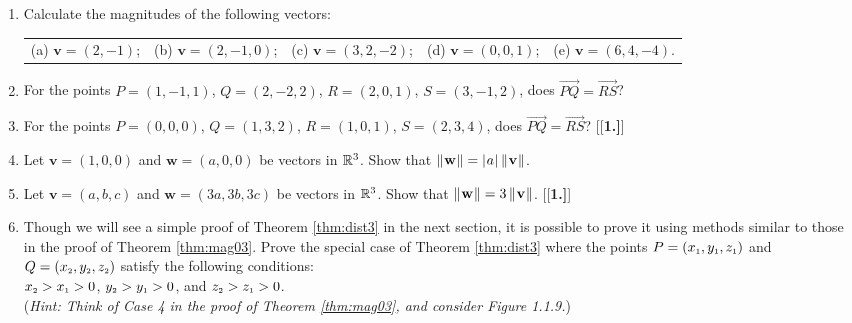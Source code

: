 \begin{enumerate}[\bfseries 1.]
 \item Calculate the magnitudes of the following vectors:\\
  \begin{tabular}{@{} l l l l l @{}}
   (a) $\textbf{v} = (2,-1)$; & (b) $\textbf{v} = (2,-1,0)$; & (c) $\textbf{v} = (3,2,-2)$; & (d) $\textbf{v} = (0,0,1)$; &
   (e) $\textbf{v} = (6,4,-4)$.
  \end{tabular}
 \item For the points $P =(1,-1,1)$, $Q=(2,-2,2)$, $R=(2,0,1)$, $S=(3,-1,2)$, does $\overrightarrow{PQ} =
  \overrightarrow{RS}$?
 \item For the points $P =(0,0,0)$, $Q=(1,3,2)$, $R=(1,0,1)$, $S=(2,3,4)$, does $\overrightarrow{PQ} =
  \overrightarrow{RS}$?
[{[\bfseries 1.]}]
 \item Let $\textbf{v} = (1,0,0)$ and $\textbf{w} = (a,0,0)$ be vectors in $\mathbb{R}^{3}$. Show that
 $\lVert\mspace{1mu}\textbf{w}\mspace{1mu}\rVert = \lvert\mspace{1mu}a\mspace{1mu}\rvert \,\lVert\mspace{1mu}\textbf{v}\mspace{1mu}\rVert$.
 \item Let $\textbf{v} = (a,b,c)$ and $\textbf{w} = (3a,3b,3c)$ be vectors in $\mathbb{R}^{3}$. Show that
 $\lVert\mspace{1mu}\textbf{w}\mspace{1mu}\rVert  = 3 \,\lVert\mspace{1mu}\textbf{v}\mspace{1mu}\rVert$.
[{[\bfseries 1.]}]
 \piccaption[]{}
 \item Though we will see a simple proof of Theorem \ref{thm:dist3} in the next section, it is possible to prove it using
 methods similar to those in the proof of Theorem \ref{thm:mag03}.  Prove the special case of Theorem \ref{thm:dist3}
 where the points $P = (x_{\scriptscriptstyle 1},y_{\scriptscriptstyle 1},z_{\scriptscriptstyle 1})$ and $Q = (x_{\scriptscriptstyle 2},y_{\scriptscriptstyle 2},z_{\scriptscriptstyle 2})$
 satisfy the following conditions:\\
 $x_{\scriptscriptstyle 2} > x_{\scriptscriptstyle 1} > 0$, $y_{\scriptscriptstyle 2} > y_{\scriptscriptstyle 1} > 0$, and
 $z_{\scriptscriptstyle 2} > z_{\scriptscriptstyle 1} > 0$.\\(\emph{Hint: Think of Case 4 in the proof of
 Theorem \ref{thm:mag03}, and consider Figure 1.1.9.})\\
\end{enumerate}

\newpage
